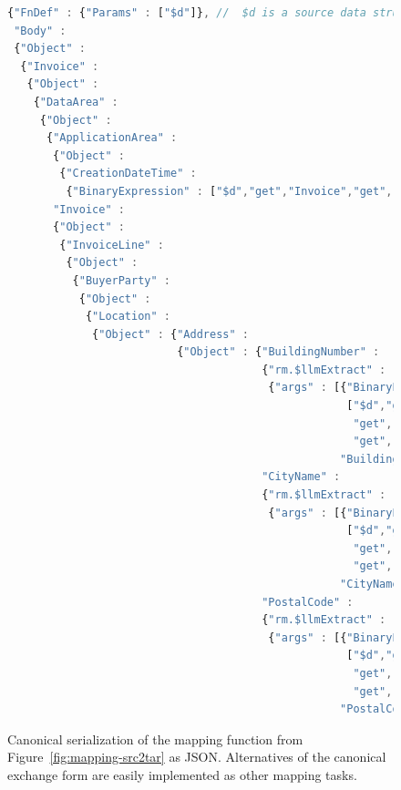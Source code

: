 \documentclass[10pt,letterpaper]{article} %
\begin{document}
\begin{figure}[H]
  \caption{Canonical serialization of the mapping function from Figure~\ref{fig:mapping-src2tar} as JSON.
    Alternatives of the canonical exchange form are easily implemented as other mapping tasks.}
 \label{fig:mapping-src2tar-toAST}
\begin{lstlisting}[language=JavaScript,basicstyle=\ttfamily\scriptsize,numberstyle=\scriptsize]
{"FnDef" : {"Params" : ["$d"]}, //  $d is a source data structure.
 "Body" :
 {"Object" :
  {"Invoice" :
   {"Object" :
    {"DataArea" :
     {"Object" :
      {"ApplicationArea" :
       {"Object" :
        {"CreationDateTime" :
         {"BinaryExpression" : ["$d","get","Invoice","get","ApplicationArea","get","CreationDateTime"]}}},
       "Invoice" :
       {"Object" :
        {"InvoiceLine" :
         {"Object" :
          {"BuyerParty" :
           {"Object" :
            {"Location" :
             {"Object" : {"Address" :
                          {"Object" : {"BuildingNumber" :
                                       {"rm.$llmExtract" :
                                        {"args" : [{"BinaryExpression" :
                                                    ["$d","get","Invoice","get","DataArea","get","Invoice",
                                                     "get","InvoiceLine","get","BuyerParty","get","Location",
                                                     "get","Address","get","AddressLine"]},
                                                   "BuildingNumber"]}},
                                       "CityName" :
                                       {"rm.$llmExtract" :
                                        {"args" : [{"BinaryExpression" :
                                                    ["$d","get","Invoice","get","DataArea","get","Invoice",
                                                     "get","InvoiceLine","get","BuyerParty","get","Location",
                                                     "get","Address","get","AddressLine"]},
                                                   "CityName"]}},
                                       "PostalCode" :
                                       {"rm.$llmExtract" :
                                        {"args" : [{"BinaryExpression" :
                                                    ["$d","get","Invoice","get","DataArea","get","Invoice",
                                                     "get","InvoiceLine","get","BuyerParty","get","Location",
                                                     "get","Address","get","AddressLine"]},
                                                   "PostalCode"]}},

\end{lstlisting}
\end{figure}
\end{document}
